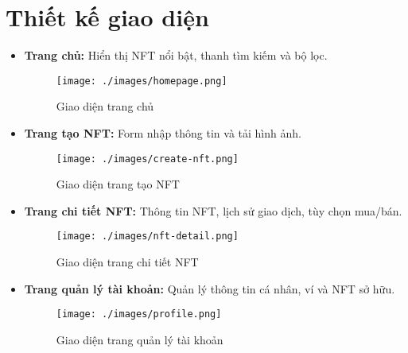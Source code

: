 \section{Thiết kế giao diện}

\begin{itemize}
    \item \textbf{Trang chủ:} Hiển thị NFT nổi bật, thanh tìm kiếm và bộ lọc.
    \begin{figure}[H]
        \centering
        \texttt{[image: ./images/homepage.png]}
        \caption{Giao diện trang chủ}
        \label{fig:homepage}
    \end{figure}

    \item \textbf{Trang tạo NFT:} Form nhập thông tin và tải hình ảnh.
    \begin{figure}[H]
        \centering
        \texttt{[image: ./images/create-nft.png]}
        \caption{Giao diện trang tạo NFT}
        \label{fig:create-nft}
    \end{figure}

    \item \textbf{Trang chi tiết NFT:} Thông tin NFT, lịch sử giao dịch, tùy chọn mua/bán.
    \begin{figure}[H]
        \centering
        \texttt{[image: ./images/nft-detail.png]}
        \caption{Giao diện trang chi tiết NFT}
        \label{fig:nft-detail}
    \end{figure}

    \item \textbf{Trang quản lý tài khoản:} Quản lý thông tin cá nhân, ví và NFT sở hữu.
    \begin{figure}[H]
        \centering
        \texttt{[image: ./images/profile.png]}
        \caption{Giao diện trang quản lý tài khoản}
        \label{fig:profile}
    \end{figure}
\end{itemize}

